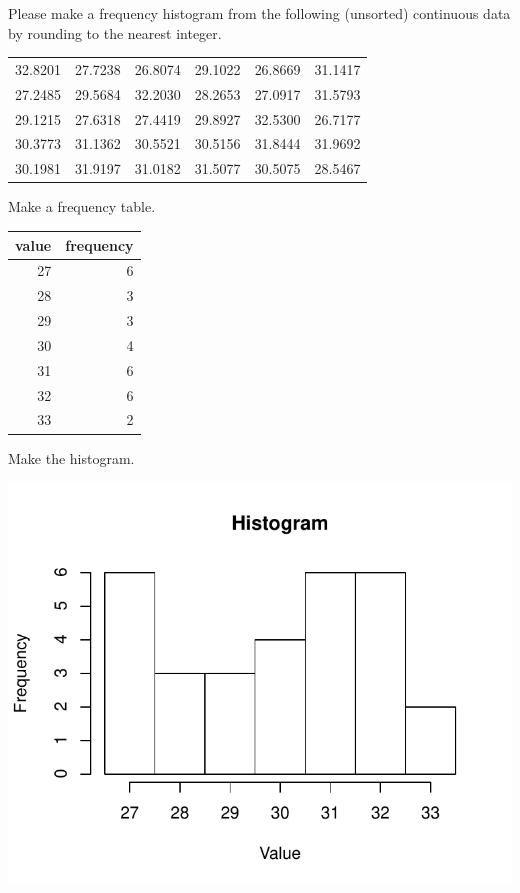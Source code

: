 
\begin{question}
Please make a frequency histogram from the following (unsorted)
continuous data by rounding to the nearest integer.

\begin{longtable}[]{@{}rrrrrr@{}}
\toprule
32.8201 & 27.7238 & 26.8074 & 29.1022 & 26.8669 & 31.1417\tabularnewline
27.2485 & 29.5684 & 32.2030 & 28.2653 & 27.0917 & 31.5793\tabularnewline
29.1215 & 27.6318 & 27.4419 & 29.8927 & 32.5300 & 26.7177\tabularnewline
30.3773 & 31.1362 & 30.5521 & 30.5156 & 31.8444 & 31.9692\tabularnewline
30.1981 & 31.9197 & 31.0182 & 31.5077 & 30.5075 & 28.5467\tabularnewline
\bottomrule
\end{longtable}
\end{question}

\begin{solution}
Make a frequency table.

\begin{longtable}[]{@{}rr@{}}
\toprule
value & frequency\tabularnewline
\midrule
\endhead
27 & 6\tabularnewline
28 & 3\tabularnewline
29 & 3\tabularnewline
30 & 4\tabularnewline
31 & 6\tabularnewline
32 & 6\tabularnewline
33 & 2\tabularnewline
\bottomrule
\end{longtable}

Make the histogram.

\includegraphics{barchart-1.pdf}\\
\end{solution}

